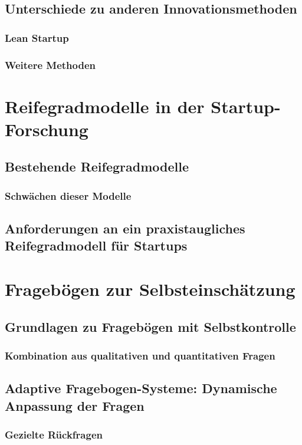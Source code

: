 \subsection{Unterschiede zu anderen Innovationsmethoden}
\subsubsection{Lean Startup}
\subsubsection{Weitere Methoden}

\section{Reifegradmodelle in der Startup-Forschung}
\subsection{Bestehende Reifegradmodelle}
\subsubsection{Schwächen dieser Modelle}
\subsection{Anforderungen an ein praxistaugliches Reifegradmodell für Startups}

\section{Fragebögen zur Selbsteinschätzung}
\subsection{Grundlagen zu Fragebögen mit Selbstkontrolle}
\subsubsection{Kombination aus qualitativen und quantitativen Fragen}
\subsection{Adaptive Fragebogen-Systeme: Dynamische Anpassung der Fragen}
\subsubsection{Gezielte Rückfragen}

